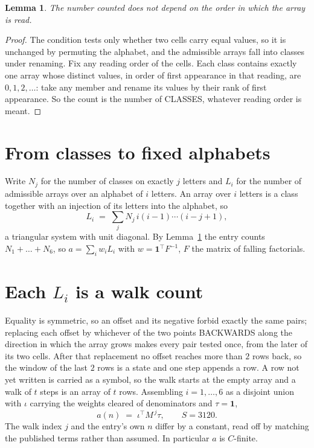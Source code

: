 \documentclass[11pt,a4paper]{article}
\theoremstyle{plain}
\newtheorem{lemma}[theorem]{Lemma}
\theoremstyle{definition}
\begin{document}
\begin{lemma}\label{lem:order}
The number counted does not depend on the order in which the array is read.
\end{lemma}

\begin{proof}
The condition tests only whether two cells carry equal values, so it is unchanged by permuting
the alphabet, and the admissible arrays fall into classes under renaming. Fix any reading order
of the cells. Each class contains exactly one array whose distinct values, in order of first
appearance in that reading, are $0,1,2,\dots$: take any member and rename its values by their
rank of first appearance. So the count is the number of CLASSES, whatever reading order is
meant.
\end{proof}

\section{From classes to fixed alphabets}

Write $N_j$ for the number of classes on exactly $j$ letters and $L_i$ for the number of
admissible arrays over an alphabet of $i$ letters. An array over $i$ letters is a class together
with an injection of its letters into the alphabet, so
\[
L_i\;=\;\sum_j N_j\,i(i-1)\cdots(i-j+1),
\]
a triangular system with unit diagonal. By Lemma~\ref{lem:order} the entry counts
$N_1+\dots+N_{6}$, so $a=\sum_i w_iL_i$ with $w=\mathbf{1}^{\!\top}F^{-1}$, $F$ the
matrix of falling factorials.

\section{Each $L_i$ is a walk count}

Equality is symmetric, so an offset and its negative forbid exactly the same pairs; replacing
each offset by whichever of the two points BACKWARDS along the direction in which the array
grows makes every pair tested once, from the later of its two cells. After that replacement no
offset reaches more than $2$ rows back, so the window of the last $2$
rows is a state and one step appends a row. A row not yet written is
carried as a symbol, so the walk starts at the empty array and a walk of $t$ steps is an array
of $t$ rows. Assembling $i=1,\dots,6$ as a disjoint union with $\iota$ carrying the
weights cleared of denominators and $\tau=\mathbf{1}$,
\[
a(n)\;=\;\iota^{\!\top}M^{\,j}\tau ,\qquad S=3120.
\]
The walk index $j$ and the entry's own $n$ differ by a constant, read off by matching the
published terms rather than assumed. In particular $a$ is $C$-finite.
\end{document}
